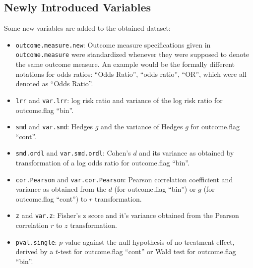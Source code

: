 \documentclass[11pt,a4paper,twoside]{book}\usepackage[]{graphicx}\usepackage[]{color}
\begin{document}
\subsection{Newly Introduced Variables}
Some new variables are added to the obtained dataset:
\begin{itemize}
\item \texttt{outcome.measure.new}: Outcome measure specifications given in \texttt{outcome.measure} were standardized whenever they were supposed to denote the same outcome measure. An example would be the formally different notations for odds ratios: ``Odds Ratio'', ``odds ratio'', ``OR'', which were all denoted as ``Odds Ratio''.
\item \texttt{lrr} and \texttt{var.lrr}: log risk ratio and variance of the log risk ratio for outcome.flag ``bin''.
\item \texttt{smd} and \texttt{var.smd}: Hedges $g$ and the variance of Hedges $g$ for outcome.flag ``cont''. 
\item \texttt{smd.ordl} and \texttt{var.smd.ordl}: Cohen's $d$ and its variance as obtained by transformation of a log odds ratio for outcome.flag ``bin''.
\item \texttt{cor.Pearson} and \texttt{var.cor.Pearson}: Pearson correlation coefficient and variance as obtained from the $d$ (for outcome.flag ``bin'') or $g$ (for outcome.flag ``cont'') to $r$ transformation.
\item \texttt{z} and \texttt{var.z}: Fisher's z score and it's variance obtained from the Pearson correlation $r$ to $z$ transformation.
\item \texttt{pval.single}: $p$-value against the null hypothesis of no treatment effect, derived by a $t$-test for outcome.flag ``cont'' or Wald test for outcome.flag ``bin''.

\end{itemize}
\end{document}
